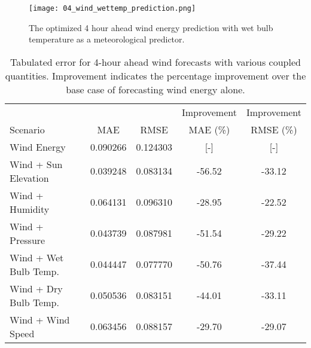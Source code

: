 \begin{figure*}[ht]
  \centering
  \texttt{[image: 04\_wind\_wettemp\_prediction.png]}
  \caption{The optimized 4 hour ahead wind energy prediction with wet bulb
  temperature as a meteorological predictor.}
  \label{fig:wind04}
\end{figure*}
  \begin{table*}[ht]
    \centering
    \caption{Tabulated error for 4-hour ahead wind forecasts with various coupled quantities. Improvement indicates the percentage improvement over the base case of forecasting wind energy alone.}
    \label{tab:wind04}
    \begin{tabular}{l|c|c|c|c}
      &  & & Improvement & Improvement \\
      Scenario  & MAE & RMSE & MAE (\%) & RMSE (\%)\\
      \hline
      Wind Energy & 0.090266 & 0.124303 & [-] & [-] \\
      Wind + Sun Elevation & 0.039248 & 0.083134 & -56.52& -33.12\\
      Wind + Humidity & 0.064131 & 0.096310 & -28.95& -22.52\\
      Wind + Pressure & 0.043739 & 0.087981 & -51.54& -29.22\\
      Wind + Wet Bulb Temp. & 0.044447 & 0.077770 & -50.76& -37.44\\
      Wind + Dry Bulb Temp. & 0.050536 & 0.083151 & -44.01 & -33.11\\
      Wind + Wind Speed & 0.063456 & 0.088157 & -29.70 & -29.07\\
    \end{tabular}
  \end{table*}

